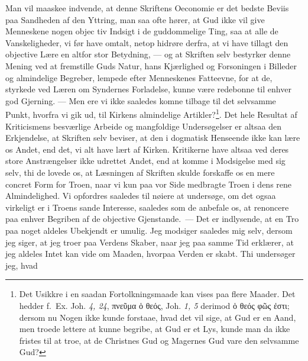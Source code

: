 \documentclass[12pt]{book}
\newcommand{\opage}[1]{\marginnote{\footnotesize\textit{[#1]}}}
\begin{document}
Man vil maaskee indvende, at denne Skriftens Oeconomie er det bedste Beviis
paa Sandheden af den Yttring, man saa ofte hører, at Gud ikke vil give
Menneskene nogen objec\-%
\opage{113}\setcounter{footnote}{0}%
tiv Indsigt i de guddommelige Ting, saa at alle de Vanskeligheder, vi før have
omtalt, netop hidrøre derfra, at vi have tillagt den objective Lære en altfor
stor Betydning, --- og at Skriften selv bestyrker denne Mening ved at
fremstille Guds Natur, hans Kjærlighed og Forsoningen i Billeder og
almindelige Begreber, lempede efter Menneskenes Fatteevne, for at de, styrkede
ved Læren om Syndernes Forladelse, kunne være redebonne til enhver god
Gjerning. --- Men ere vi ikke saaledes komne tilbage til det selvsamme Punkt,
hvorfra vi gik ud, til Kirkens almindelige Artikler?\footnote{Det Usikkre i en
saadan Fortolkningsmaade kan vises paa flere Maader. Det hedder f.~Ex. Joh.
\textit{4, 24}, πνεῦμα ὁ θεός, Joh. \textit{1, 5} derimod ὁ θεός φῶς ἐστι;
dersom nu Nogen ikke kunde forstaae, hvad det vil sige, at Gud er en Aand, men
troede lettere at kunne begribe, at Gud er et Lys, kunde man da ikke fristes
til at troe, at de Christnes Gud og Magernes Gud vare den selvsamme Gud?}. Det
hele Resultat af Kriticismens besværlige Arbeide og mangfoldige Undersøgelser
er altsaa den Erkjendelse, at Skriften selv beviser, at den i dogmatisk
Henseende ikke kan lære os Andet, end det, vi alt have lært af Kirken.
Kritikerne have altsaa ved deres store Anstrængelser ikke udrettet Andet, end
at komme i Modsigelse med sig selv, thi de lovede os, at Læsningen af Skriften
skulde forskaffe os en mere concret Form for Troen, naar vi kun paa vor Side
medbragte Troen i dens rene Almindelighed. Vi opfordres saaledes til nøiere at
undersøge, om det ogsaa virkeligt er i Troens sande Interesse, saaledes som de
anbefale os, at renoncere paa enhver Begriben af de objective
Gjenstande.~--- Det er indlysende, at en Tro paa noget aldeles Ubekjendt er
umulig. Jeg modsiger saaledes mig selv, dersom jeg siger, at jeg troer paa
Verdens Skaber, naar jeg paa samme Tid erklærer, at jeg aldeles Intet kan vide
om Maaden, hvorpaa Verden er skabt. Thi undersøger jeg, hvad
\end{document}

